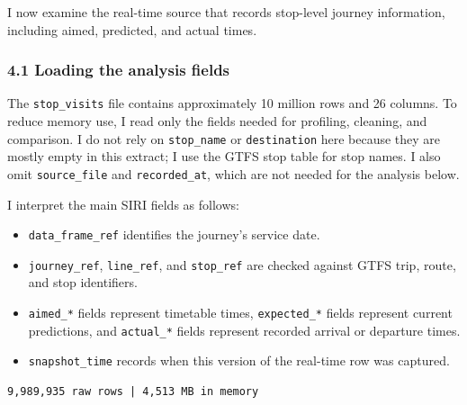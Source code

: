 \documentclass[11pt]{article}
\providecommand{\tightlist}{%
      \setlength{\itemsep}{0pt}\setlength{\parskip}{0pt}}
\begin{document}
I now examine the real-time source that records stop-level journey
information, including aimed, predicted, and actual times.

    \subsubsection{4.1 Loading the analysis
fields}\label{loading-the-analysis-fields}

The \texttt{stop\_visits} file contains approximately 10 million rows
and 26 columns. To reduce memory use, I read only the fields needed for
profiling, cleaning, and comparison. I do not rely on
\texttt{stop\_name} or \texttt{destination} here because they are mostly
empty in this extract; I use the GTFS stop table for stop names. I also
omit \texttt{source\_file} and \texttt{recorded\_at}, which are not
needed for the analysis below.

I interpret the main SIRI fields as follows:

\begin{itemize}
\tightlist
\item
  \texttt{data\_frame\_ref} identifies the journey's service date.
\item
  \texttt{journey\_ref}, \texttt{line\_ref}, and \texttt{stop\_ref} are
  checked against GTFS trip, route, and stop identifiers.
\item
  \texttt{aimed\_*} fields represent timetable times,
  \texttt{expected\_*} fields represent current predictions, and
  \texttt{actual\_*} fields represent recorded arrival or departure
  times.
\item
  \texttt{snapshot\_time} records when this version of the real-time row
  was captured.
\end{itemize}

    \begin{Verbatim}[commandchars=\\\{\}]
9,989,935 raw rows | 4,513 MB in memory
    \end{Verbatim}
\end{document}
